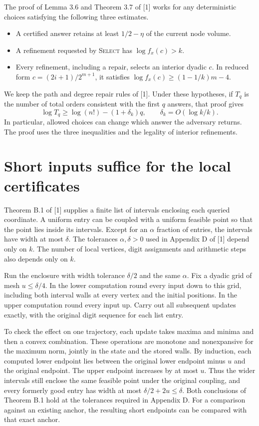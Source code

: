 \documentclass[11pt,a4paper]{article}
\begin{document}
The proof of Lemma 3.6 and Theorem 3.7 of [1] works for any deterministic choices
satisfying the following three estimates.
\begin{itemize}
\item A certified answer retains at least $1/2-\eta$ of the current node volume.
\item A refinement requested by \textsc{Select} has $\log f_x(c)>k$.
\item Every refinement, including a repair, selects an interior dyadic $c$.
In reduced form $c=(2i+1)/2^{m+1}$, it satisfies
$\log f_x(c)\ge(1-1/k)m-4$.
\end{itemize}
We keep the path and degree repair rules of [1]. Under these hypotheses, if $T_q$
is the number of total orders consistent with the first $q$ answers, that proof gives
\begin{equation}
\log T_q\ge\log(n!)-(1+\delta_k)q,\qquad \delta_k=O(\log k/k).
\end{equation}
In particular, allowed choices can change which answer the adversary returns.
The proof uses the three inequalities and the legality of interior refinements.

\newpage
\section{Short inputs suffice for the local certificates}
Theorem B.1 of [1] supplies a finite list of intervals enclosing each queried
coordinate. A uniform entry can be coupled with a uniform feasible point so that
the point lies inside its intervals. Except for an $\alpha$ fraction of entries,
the intervals have width at most $\delta$. The tolerances $\alpha,\delta>0$ used
in Appendix D of [1] depend only on $k$. The number of local vertices, digit
assignments and arithmetic steps also depends only on $k$.

Run the enclosure with width tolerance $\delta/2$ and the same $\alpha$. Fix a
dyadic grid of mesh $u\le\delta/4$. In the lower computation round every input
down to this grid, including both interval walls at every vertex and the initial
positions. In the upper computation round every input up. Carry out all
subsequent updates exactly, with the original digit sequence for each list entry.

To check the effect on one trajectory, each update takes maxima and minima and
then a convex combination. These operations are monotone and nonexpansive for
the maximum norm, jointly in the state and the stored walls. By induction, each
computed lower endpoint lies between the original lower endpoint minus $u$ and
the original endpoint. The upper endpoint increases by at most $u$. Thus the
wider intervals still enclose the same feasible point under the original
coupling, and every formerly good entry has width at most $\delta/2+2u\le\delta$.
Both conclusions of Theorem B.1 hold at the tolerances required in Appendix D.
For a comparison against an existing anchor, the resulting short endpoints can
be compared with that exact anchor.
\end{document}
